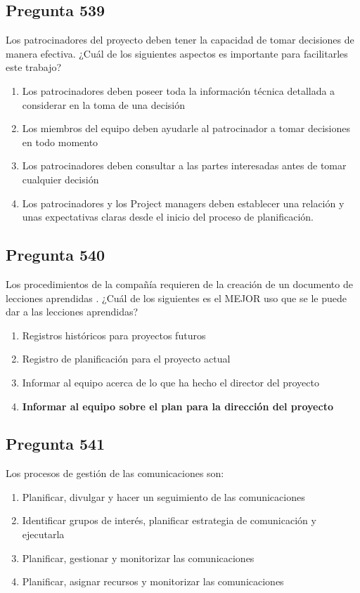 \documentclass[11pt,a4paper]{article}
\begin{document}
\subsection*{Pregunta 539}
Los patrocinadores del proyecto deben tener la capacidad de tomar decisiones de manera efectiva. ¿Cuál de los siguientes aspectos es importante para facilitarles este trabajo?

\begin{enumerate}[label=\alph*)]
  \item Los patrocinadores deben poseer toda la información técnica detallada a considerar en la toma de una decisión
  \item Los miembros del equipo deben ayudarle al patrocinador a tomar decisiones en todo momento
  \item Los patrocinadores deben consultar a las partes interesadas antes de tomar cualquier decisión
  \item Los patrocinadores y los Project managers deben establecer una relación y unas expectativas claras desde el inicio del proceso de planificación.
\end{enumerate}

\subsection*{Pregunta 540}
Los procedimientos de la compañía requieren de la creación de un documento de lecciones aprendidas . ¿Cuál de los siguientes es el MEJOR uso que se le puede dar a las lecciones aprendidas?

\begin{enumerate}[label=\alph*)]
  \item Registros históricos para proyectos futuros
  \item Registro de planificación para el proyecto actual
  \item Informar al equipo acerca de lo que ha hecho el director del proyecto
  \item \textbf{Informar al equipo sobre el plan para la dirección del proyecto}
\end{enumerate}

\subsection*{Pregunta 541}
Los procesos de gestión de las comunicaciones son:

\begin{enumerate}[label=\alph*)]
  \item Planificar, divulgar y hacer un seguimiento de las comunicaciones
  \item Identificar grupos de interés, planificar estrategia de comunicación y ejecutarla
  \item Planificar, gestionar y monitorizar las comunicaciones
  \item Planificar, asignar recursos y monitorizar las comunicaciones
\end{enumerate}
\end{document}
